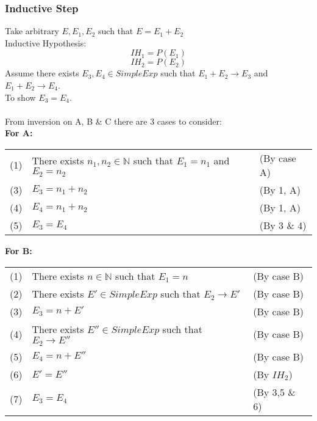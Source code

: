\documentclass{report}
\begin{document}
\subsubsection*{Inductive Step}
Take arbitrary $E, E_1,E_2$ such that $E = E_1 + E_2$
\\ Inductive Hypothesis:
\[IH_1 = P(E_1)\]
\[IH_2 = P(E_2)\]
Assume there exists $E_3, E_4 \in SimpleExp$ such that $E_1 + E_2 \to E_3$ and $E_1 + E_2 \to E_4$.
\\ To show $E_3 = E_4$.
\\
\\ From inversion on A, B \& C there are 3 cases to consider:
\\ \textbf{For A:}
\begin{center}
	\begin{tabular}{l l l}
		(1) & There exists $n_1, n_2 \in \mathbb{N}$ such that $E_1 = n_1$ and $E_2 = n_2$ & (By case A) \\
		(3) & $E_3 = n_1 + n_2$                                                            & (By 1, A)   \\
		(4) & $E_4 = n_1 + n_2$                                                            & (By 1, A)   \\
		(5) & $E_3 = E_4$                                                                  & (By 3 \& 4) \\
	\end{tabular}
\end{center}
\textbf{For B:}
\begin{center}
	\begin{tabular}{l l l}
		(1) & There exists $n \in \mathbb{N}$ such that $E_1 = n$      & (By case B)   \\
		(2) & There exists $E' \in SimpleExp$ such that $E_2 \to E'$   & (By case B)   \\
		(3) & $E_3 = n + E'$                                           & (By case B)   \\
		(4) & There exists $E'' \in SimpleExp$ such that $E_2 \to E''$ & (By case B)   \\
		(5) & $E_4 = n + E''$                                          & (By case B)   \\
		(6) & $E' = E''$                                               & (By $IH_2$)   \\
		(7) & $E_3 = E_4$                                              & (By 3,5 \& 6) \\
	\end{tabular}
\end{center}
\end{document}
